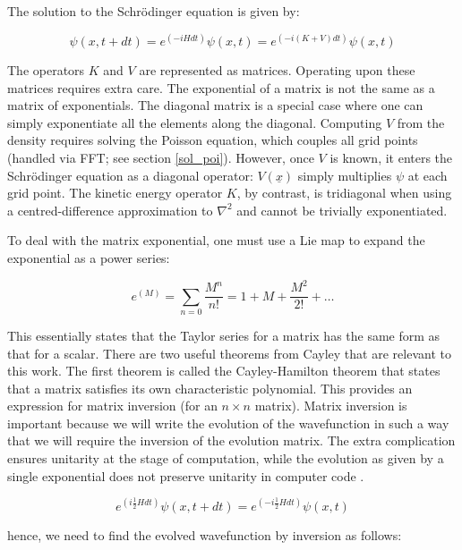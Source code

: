 The solution to the Schr\"odinger equation is given by:

\begin{equation}
 \psi(x, t+dt) = e^{(-iHdt)} \psi(x, t) = e^{(-i(K+V)dt)} \psi(x, t)
\end{equation}

\noindent The operators $K$ and $V$ are represented as matrices. Operating upon these matrices requires extra care. The exponential of a matrix is not the same as a matrix of exponentials. The diagonal matrix is a special case where one can simply exponentiate all the elements along the diagonal. Computing $V$ from the density requires solving the Poisson equation, which couples all grid points (handled via FFT; see section \ref{sol_poi}). However, once $V$ is known, it enters the Schr\"odinger equation as a diagonal operator: $V(\underline{x})$ simply multiplies $\psi$ at each grid point. The kinetic energy operator $K$, by contrast, is tridiagonal when using a centred-difference approximation to $\nabla^2$ and cannot be trivially exponentiated.

To deal with the matrix exponential, one must use a Lie map to expand the exponential as a power series:

\begin{equation}
 e^{(M)} = \sum_{n = 0} \frac{M^n}{n!} = 1 + M + \frac{M^2}{2!} + \ldots
\end{equation}

\noindent This essentially states that the Taylor series for a matrix has the same form as that for a scalar. There are two useful theorems from Cayley that are relevant to this work. The first theorem is called the Cayley-Hamilton theorem that states that a matrix satisfies its own characteristic polynomial. This provides an expression for matrix inversion (for an $n\times n$ matrix). Matrix inversion is important because we will write the evolution of the wavefunction in such a way that we will require the inversion of the evolution matrix. The extra complication ensures unitarity at the stage of computation, while the evolution as given by a single exponential does not preserve unitarity in computer code \citep{bib_nr}.

\begin{equation}
 e^{(i\frac{1}{2}Hdt)} \psi(x, t+dt) = e^{(-i\frac{1}{2}Hdt)} \psi(x, t)
\end{equation}

\noindent hence, we need to find the evolved wavefunction by inversion as follows:

